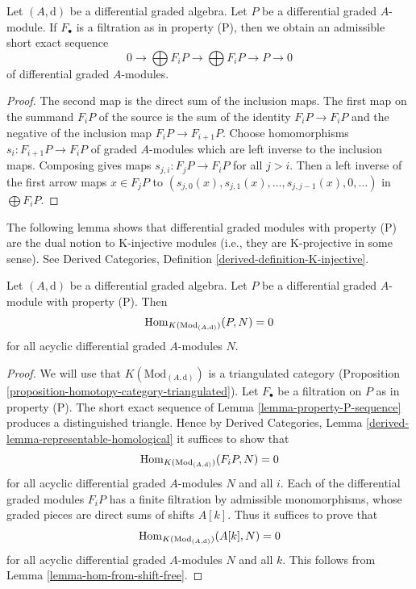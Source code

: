 \begin{lemma}
\label{lemma-property-P-sequence}
Let $(A, \text{d})$ be a differential graded algebra.
Let $P$ be a differential graded $A$-module. If $F_\bullet$
is a filtration as in property (P), then we obtain an
admissible short exact sequence
$$
0 \to
\bigoplus\nolimits F_iP \to
\bigoplus\nolimits F_iP \to P \to 0
$$
of differential graded $A$-modules.
\end{lemma}

\begin{proof}
The second map is the direct sum of the inclusion maps.
The first map on the summand $F_iP$ of the source is the sum
of the identity $F_iP \to F_iP$ and the negative of the inclusion
map $F_iP \to F_{i + 1}P$. Choose homomorphisms $s_i : F_{i + 1}P \to F_iP$
of graded $A$-modules which are left inverse to the inclusion maps.
Composing gives maps $s_{j, i} : F_jP \to F_iP$ for all $j > i$.
Then a left inverse of the first arrow maps $x \in F_jP$ to
$(s_{j, 0}(x), s_{j, 1}(x), \ldots, s_{j, j - 1}(x), 0, \ldots)$
in $\bigoplus F_iP$.
\end{proof}

\noindent
The following lemma shows that differential graded modules with
property (P) are the dual notion to K-injective modules
(i.e., they are K-projective in some sense). See
Derived Categories, Definition \ref{derived-definition-K-injective}.

\begin{lemma}
\label{lemma-property-P-K-projective}
Let $(A, \text{d})$ be a differential graded algebra.
Let $P$ be a differential graded $A$-module with property (P).
Then
$$
\mathop{\mathrm{Hom}}\nolimits_{K(\text{Mod}_{(A, \text{d})})}(P, N) = 0
$$
for all acyclic differential graded $A$-modules $N$.
\end{lemma}

\begin{proof}
We will use that $K(\text{Mod}_{(A, \text{d})})$ is a triangulated
category (Proposition \ref{proposition-homotopy-category-triangulated}).
Let $F_\bullet$ be a filtration on $P$ as in property (P).
The short exact sequence of Lemma \ref{lemma-property-P-sequence}
produces a distinguished triangle. Hence by
Derived Categories, Lemma \ref{derived-lemma-representable-homological}
it suffices to show that
$$
\mathop{\mathrm{Hom}}\nolimits_{K(\text{Mod}_{(A, \text{d})})}(F_iP, N) = 0
$$
for all acyclic differential graded $A$-modules $N$ and all $i$.
Each of the differential graded modules $F_iP$ has a finite filtration
by admissible monomorphisms, whose graded pieces are direct sums
of shifts $A[k]$. Thus it suffices to prove that
$$
\mathop{\mathrm{Hom}}\nolimits_{K(\text{Mod}_{(A, \text{d})})}(A[k], N) = 0
$$
for all acyclic differential graded $A$-modules $N$ and all $k$.
This follows from Lemma \ref{lemma-hom-from-shift-free}.
\end{proof}

